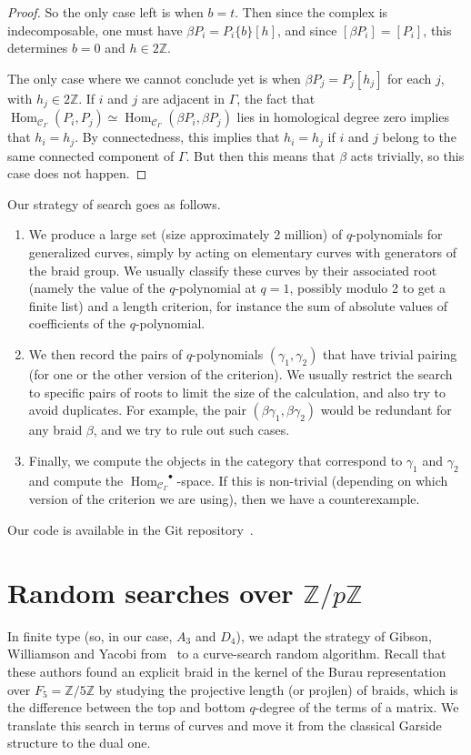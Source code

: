 \documentclass[a4paper]{amsart}
\newcommand{\Z}{\mathbb{Z}}
\newcommand{\0}{\mathbf{0}}
\DeclareMathOperator{\Hom}{Hom}
\newcommand{\HOM}{\ensuremath{\Hom_{\mathcal{C}_\Gamma}}}
\theoremstyle{theorem}
\begin{document}
\begin{proof}
So the only case left is when $b=t$. Then since the complex is indecomposable, one must have $\beta P_i=P_i\{b\}[h]$, and since $[\beta P_i]=[P_i]$, this determines $b=0$ and $h\in 2\Z$.

The only case where we cannot conclude yet is when $\beta P_j=P_j[h_j]$ for each $j$, with $h_j\in 2\Z$. If $i$ and $j$ are adjacent in $\Gamma$, the fact that $\HOM(P_i,P_j)\simeq\HOM(\beta P_i, \beta P_j)$ lies in homological degree zero implies that $h_i=h_j$. By connectedness, this implies that $h_i=h_{j}$ if $i$ and $j$ belong to the same connected component of $\Gamma$. But then this means that $\beta$ acts trivially, so this case does not happen.
\end{proof}


Our strategy of search goes as follows.
\begin{enumerate}
\item We produce a large set (size approximately 2 million) of $q$-polynomials for generalized curves, simply by acting on elementary curves with generators of the braid group.
  We usually classify these curves by their associated root (namely the value of the \(q\)-polynomial at $q=1$, possibly modulo 2 to get a finite list) and a length criterion, for instance the sum of absolute values of coefficients of the $q$-polynomial.
\item We then record the pairs of \(q\)-polynomials $(\gamma_1,\gamma_2)$ that have trivial pairing (for one or the other version of the criterion).
  We usually restrict the search to specific pairs of roots to limit the size of the calculation, and also try to avoid duplicates.
  For example, the pair $(\beta \gamma_1,\beta \gamma_2)$ would be redundant for any braid \(\beta\), and we try to rule out such cases.
\item Finally, we compute the objects in the category that correspond to $\gamma_1$ and $\gamma_2$ and compute the $\HOM^{\bullet}$-space.
  If this is non-trivial (depending on which version of the criterion we are using), then we have a counterexample.
\end{enumerate}
Our code is available in the Git repository~\cite{BQ_git}.

\section{Random searches over $\Z/p\Z$}\label{sec:bucket}

In finite type (so, in our case, $A_3$ and $D_4$), we adapt the strategy of Gibson, Williamson and Yacobi from~\cite{GibsonWilliamsonYacobi} to a curve-search random algorithm.
Recall that these authors found an explicit braid in the kernel of the Burau representation over $F_5=\Z/5\Z$ by studying the projective length (or \textsf{projlen}) of braids, which is the difference between the top and bottom $q$-degree of the terms of a matrix.
We translate this search in terms of curves and move it from the classical Garside structure to the dual one.
\end{document}
